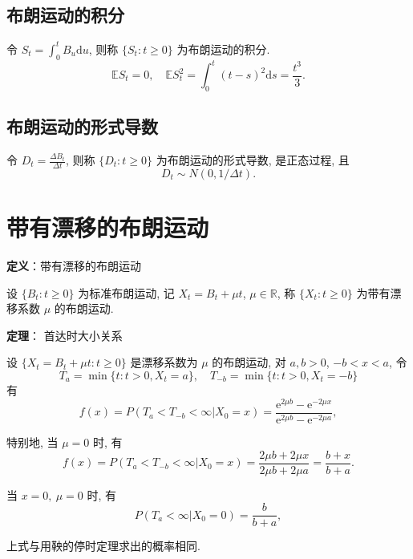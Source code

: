 \documentclass[openany]{ctexbook}
\theoremstyle{kaiti}
\theoremstyle{normal}
\begin{document}
\subsection{布朗运动的积分}
令 $\displaystyle S_t=\int_0^tB_u\mathrm{d}u$, 则称 $\{S_t:t\geqslant0\}$ 为布朗运动的积分.
\begin{equation}
  \mathbb{E}S_t=0,\quad \mathbb{E}S_t^2=\int_0^t (t-s)^2\mathrm{d}s=\frac{t^3}{3}.
\end{equation}

\subsection{布朗运动的形式导数}
令 $D_t=\frac{\Delta B_t}{\Delta t}$, 则称 $\{D_t:t\geqslant0\}$ 为布朗运动的形式导数, 是正态过程, 且
\begin{equation}
  D_t\sim N(0,1/\Delta t).
\end{equation}

\section{带有漂移的布朗运动}

\textbf{定义}：带有漂移的布朗运动

设 $\{B_t:t\geqslant0\}$ 为标准布朗运动, 记 $X_t=B_t+\mu t$, $\mu\in\mathbb{R}$, 称 $\{X_t:t\geqslant0\}$ 为带有漂移系数 $\mu$ 的布朗运动.

\textbf{定理}： 首达时大小关系

设 $\{X_t=B_t+\mu t:t\geqslant0\}$ 是漂移系数为 $\mu$ 的布朗运动, 对 $a,b>0$, $-b<x<a$, 令
\begin{equation}
  T_a=\min\{t:t>0,X_t=a\},\quad T_{-b}=\min\{t:t>0,X_t=-b\}
\end{equation}
 有
\begin{equation}
  f(x)=P(T_a<T_{-b}<\infty|X_0=x)=\frac{\mathrm{e}^{2\mu b}-\mathrm{e}^{-2\mu x}}{\mathrm{e}^{2\mu b}-\mathrm{e}^{-2\mu a}},
\end{equation}

特别地, 当 $\mu=0$ 时, 有
\begin{equation}
  f(x)=P(T_a<T_{-b}<\infty|X_0=x)=\frac{2\mu b+2\mu x}{2\mu b+2\mu a}=\frac{b+x}{b+a}.
\end{equation}

当 $x=0,~\mu=0$ 时, 有
\begin{equation}
  P(T_a<\infty|X_0=0)=\frac{b}{b+a},
\end{equation}

上式与用鞅的停时定理求出的概率相同.
\end{document}
